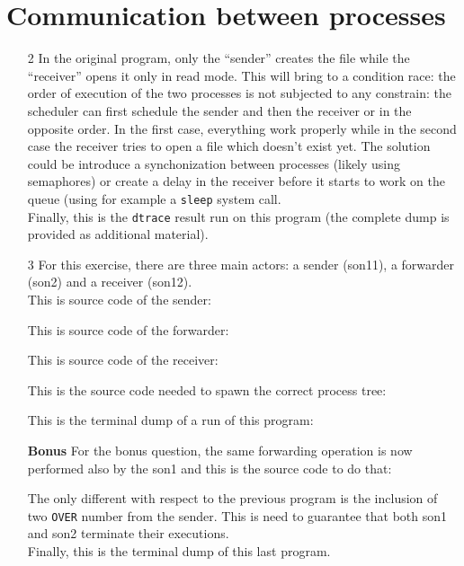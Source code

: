\documentclass{article}
\begin{document}
\section{Communication between processes}
\begin{itemize}
\item[2]
In the original program, only the ``sender'' creates the file while the ``receiver'' opens it only in read mode. This will bring to a condition race: the order of execution of the two processes is not subjected to any constrain: the scheduler can first schedule the sender and then the receiver or in the opposite order. In the first case, everything work properly while in the second case the receiver tries to open a file which doesn't exist yet. The solution could be introduce a synchonization between processes (likely using semaphores) or create a delay in the receiver before it starts to work on the queue (using for example a \texttt{sleep} system call.\\



Finally, this is the \texttt{dtrace} result run on this program (the complete dump is provided as additional material).


   
\item[3]
For this exercise, there are three main actors: a sender (son11), a forwarder (son2) and a receiver (son12). \\
This is source code of the sender:

This is source code of the forwarder:

This is source code of the receiver:

This is the source code needed to spawn the correct process tree:


This is the terminal dump of a run of this program:



\item[\bf Bonus] 
For the bonus question, the same forwarding operation is now performed also by  the son1 and this is the source code to do that:

The only different with respect to the previous program is the inclusion of two \texttt{OVER} number from the sender. This is need to guarantee that both son1 and son2 terminate their executions.\\

Finally, this is the terminal dump of this last program.





 \end{itemize}
\end{document}
